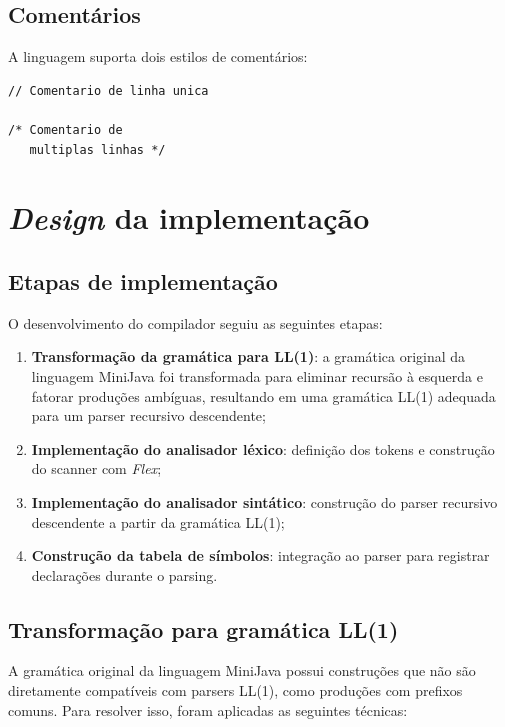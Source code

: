 \documentclass[a4paper, 12pt]{article}
\begin{document}
\subsection{Coment\'arios}

A linguagem suporta dois estilos de coment\'arios:

\begin{lstlisting}[style=minijava, caption={Coment\'arios}]
// Comentario de linha unica

/* Comentario de
   multiplas linhas */
\end{lstlisting}

\section{\textit{Design} da implementa\c{c}\~ao}

\subsection{Etapas de implementa\c{c}\~ao}

O desenvolvimento do compilador seguiu as seguintes etapas:

\begin{enumerate}
    \item \textbf{Transforma\c{c}\~ao da gram\'atica para LL(1)}: a gram\'atica original da linguagem MiniJava foi transformada para eliminar recurs\~ao \`a esquerda e fatorar produ\c{c}\~oes amb\'iguas, resultando em uma gram\'atica LL(1) adequada para um parser recursivo descendente;
    \item \textbf{Implementa\c{c}\~ao do analisador l\'exico}: defini\c{c}\~ao dos tokens e constru\c{c}\~ao do scanner com \textit{Flex};
    \item \textbf{Implementa\c{c}\~ao do analisador sint\'atico}: constru\c{c}\~ao do parser recursivo descendente a partir da gram\'atica LL(1);
    \item \textbf{Constru\c{c}\~ao da tabela de s\'imbolos}: integra\c{c}\~ao ao parser para registrar declara\c{c}\~oes durante o parsing.
\end{enumerate}

\subsection{Transforma\c{c}\~ao para gram\'atica LL(1)}

A gram\'atica original da linguagem MiniJava possui constru\c{c}\~oes que n\~ao s\~ao diretamente compat\'iveis com parsers LL(1), como produ\c{c}\~oes com prefixos comuns. Para resolver isso, foram aplicadas as seguintes t\'ecnicas:
\end{document}
